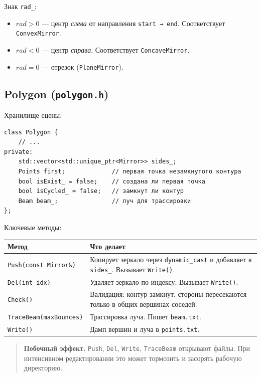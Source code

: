 \documentclass[a4paper,11pt]{article}
\newcommand{\file}[1]{\texttt{#1}}
\newcommand{\code}[1]{\texttt{#1}}
\begin{document}
Знак \code{rad\_}:
\begin{itemize}[leftmargin=*]
    \item $rad > 0$ — центр \emph{слева} от направления \code{start → end}.
          Соответствует \code{ConvexMirror}.
    \item $rad < 0$ — центр \emph{справа}. Соответствует \code{ConcaveMirror}.
    \item $rad = 0$ — отрезок (\code{PlaneMirror}).
\end{itemize}

\subsection{Polygon (\file{polygon.h})}

Хранилище сцены.

\begin{lstlisting}[caption={Поля Polygon}]
class Polygon {
    // ...
private:
    std::vector<std::unique_ptr<Mirror>> sides_;
    Points first;             // первая точка незамкнутого контура
    bool isExist_ = false;    // создана ли первая точка
    bool isCycled_ = false;   // замкнут ли контур
    Beam beam_;               // луч для трассировки
};
\end{lstlisting}

Ключевые методы:

\begin{longtable}{@{}p{5.5cm}p{9cm}@{}}
\toprule
\textbf{Метод} & \textbf{Что делает} \\ \midrule
\endhead
\code{Push(const Mirror\&)} & Копирует зеркало через \code{dynamic\_cast} и добавляет в \code{sides\_}. Вызывает \code{Write()}. \\
\code{Del(int idx)} & Удаляет зеркало по индексу. Вызывает \code{Write()}. \\
\code{Check()} & Валидация: контур замкнут, стороны пересекаются только в общих вершинах соседей. \\
\code{TraceBeam(maxBounces)} & Трассировка луча. Пишет \code{beam.txt}. \\
\code{Write()} & Дамп вершин и луча в \code{points.txt}. \\
\bottomrule
\end{longtable}

\begin{quote}
\textbf{Побочный эффект.} \code{Push}, \code{Del}, \code{Write},
\code{TraceBeam} открывают файлы. При интенсивном редактировании это
может тормозить и засорять рабочую директорию.
\end{quote}
\end{document}
